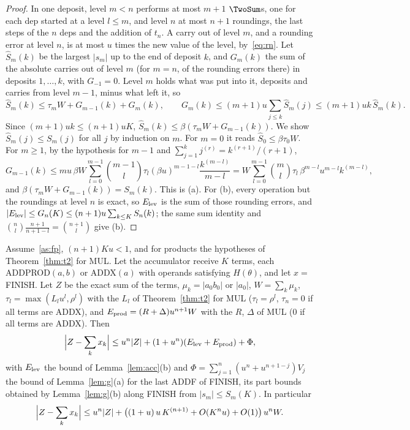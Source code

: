 \begin{proof}
In one deposit, level $m < n$ performs at most $m+1$ $\TwoSum$s, one for each dep started at a level $l \le m$, and
level $n$ at most $n+1$ roundings, the last steps of the $n$ deps and the addition of $t_n$. A carry out of level $m$,
and a rounding error at level $n$, is at most $u$ times the new value of the level, by~\eqref{eq:rn}. Let $\hat S_m(k)$
be the largest $|s_m|$ up to the end of deposit $k$, and $G_m(k)$ the sum of the absolute carries out of level $m$
(for $m = n$, of the rounding errors there) in deposits $1, \dots, k$, with $G_{-1} = 0$. Level $m$ holds what was put
into it, deposits and carries from level $m-1$, minus what left it, so
\[
\hat S_m(k) \le \tau_m W + G_{m-1}(k) + G_m(k), \qquad G_m(k) \le (m+1)u\sum_{j \le k}\hat S_m(j) \le (m+1)uk\,\hat
S_m(k).
\]
Since $(m+1)uk \le (n+1)uK$, $\hat S_m(k) \le \beta(\tau_mW + G_{m-1}(k))$. We show $\hat S_m(j) \le S_m(j)$ for all
$j$ by induction on $m$. For $m = 0$ it reads $\hat S_0 \le \beta\tau_0W$. For $m \ge 1$, by the hypothesis for
$m - 1$ and $\sum_{j=1}^{k} j^{(r)} = k^{(r+1)}/(r+1)$,
\[
G_{m-1}(k) \le mu\,\beta W\sum_{l=0}^{m-1}\binom{m-1}{l}\tau_l(\beta u)^{m-1-l}\frac{k^{(m-l)}}{m-l} = W\sum_{l=0}^{m-1}
\binom{m}{l}\tau_l\,\beta^{m-l}u^{m-l}k^{(m-l)},
\]
and $\beta(\tau_mW + G_{m-1}(k)) = S_m(k)$. This is (a). For (b), every operation but the roundings at level $n$ is
exact, so $E_{\rm lev}$ is the sum of those rounding errors, and $|E_{\rm lev}| \le G_n(K) \le (n+1)u\sum_{k \le K}
S_n(k)$; the same sum identity and $\binom{n}{l}\frac{n+1}{n+1-l} = \binom{n+1}{l}$ give (b).
\end{proof}

\begin{theorem}\label{thm:acc}
Assume~\ref{as:fp}, $(n+1)Ku < 1$, and for products the hypotheses of Theorem~\ref{thm:t2} for MUL. Let the accumulator
receive $K$ terms, each ADDPROD$(a, b)$ or ADDX$(a)$ with operands satisfying $H(\theta)$, and let $x = $ FINISH. Let
$Z$ be the exact sum of the terms, $\mu_k = |a_0b_0|$ or $|a_0|$, $W = \sum_k\mu_k$, $\tau_l = \max(L_lu^l,
\rho^l)$ with the $L_l$ of Theorem~\ref{thm:t2} for MUL ($\tau_l = \rho^l$, $\tau_n = 0$ if all terms are ADDX), and
$E_{\rm prod} = (R + \Delta)u^{n+1}W$ with the $R$, $\Delta$ of MUL ($0$ if all terms are ADDX). Then
\[
\Bigl|Z - \sum_k x_k\Bigr| \le u^n|Z| + (1 + u^n)(E_{\rm lev} + E_{\rm prod}) + \Phi,
\]
with $E_{\rm lev}$ the bound of Lemma~\ref{lem:acc}(b) and $\Phi = \sum_{j=1}^{n}(u^n + u^{n+1-j})V_j$ the bound of
Lemma~\ref{lem:g}(a) for the last ADDF of FINISH, its part bounds obtained by Lemma~\ref{lem:g}(b) along FINISH from
$|s_m| \le S_m(K)$. In particular
\[
\Bigl|Z - \sum_k x_k\Bigr| \le u^n|Z| + \bigl((1+u)\,u\,K^{(n+1)} + O(K^nu) + O(1)\bigr)\,u^nW .
\]
\end{theorem}


